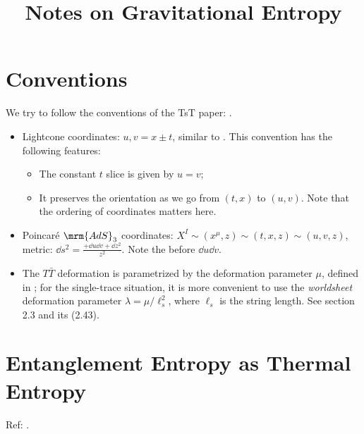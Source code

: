 \documentclass[a4paper
	,10pt
]{article}
\title{Notes on Gravitational Entropy}
\begin{document}
\maketitle
{}
\thispagestyle{empty}


\setlength{\parskip}{.1\baselineskip}
\tableofcontents
\setlength{\parskip}{\parskipnorm}

\addtocounter{section}{-1}
\section{Conventions}
	We try to follow the conventions of the TsT paper: \textcite{Apolo:2019zai}. 
	\begin{itemize}
	\item Lightcone coordinates: $u,v = x\pm t$, similar to \cite{Apolo:2019zai}. This convention has the following features:
	
		\begin{itemize}
		\item The constant $t$ slice is given by $u = v$;
		\item It preserves the orientation as we go from $(t,x)$ to $(u,v)$. Note that the ordering of coordinates matters here.
		\end{itemize}
	
	\item Poincar\'e $\mrm{AdS}_3$ coordinates: $
			X^I \sim (x^\mu,z) \sim (t,x,z) \sim (u,v,z)
		$, metric: $
			\dd{s}^2 = \frac{+\dd{u} \dd{v} + \dd{z}^2}{z^2}
		$. Note the \mquote{+} before $\dd{u} \dd{v}$. 
	
	\item The $T\bar{T}$ deformation is parametrized by the deformation parameter $\mu$, defined in \cite{Apolo:2019zai}; for the single-trace situation, it is more convenient to use the \textit{worldsheet} deformation parameter $\lambda = \mu/\ell_s^2$, where $\ell_s$ is the string length. See \cite{Apolo:2019zai} section 2.3 and its (2.43). 
	\end{itemize}
	
\pagebreak[4]
\section{Entanglement Entropy as Thermal Entropy}
	Ref: \textcite{Apolo:2020qjm}.
	
\end{document}
